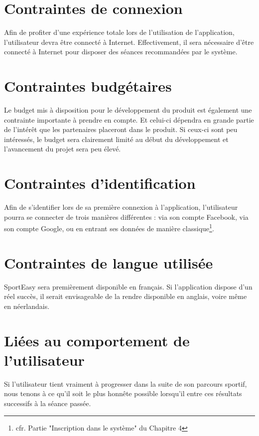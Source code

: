 \section{Contraintes de connexion}

Afin de profiter d'une expérience totale lors de l'utilisation de l'application, l'utilisateur devra être connecté à Internet. Effectivement, il sera nécessaire d'être connecté à Internet pour disposer des séances recommandées par le système.

\section{Contraintes budgétaires}

Le budget mis à disposition pour le développement du produit est également une contrainte importante à prendre en compte. Et celui-ci dépendra en grande partie de l'intérêt que les partenaires placeront dans le produit. Si ceux-ci sont peu intéressés, le budget sera clairement limité au début du développement et l'avancement du projet sera peu élevé.

\section{Contraintes d'identification}

Afin de s'identifier lors de sa première connexion à l'application, l'utilisateur pourra se connecter de trois manières différentes : via son compte Facebook, via son compte Google, ou en entrant ses données de manière classique\footnote{cfr. Partie "Inscription dans le système" du Chapitre 4}. 

\section{Contraintes de langue utilisée}

SportEasy sera premièrement disponible en français. Si l'application dispose d'un réel succès, il serait envisageable de la rendre disponible en anglais, voire même en néerlandais.

\section{Liées au comportement de l'utilisateur}

Si l'utilisateur tient vraiment à progresser dans la suite de son parcours sportif, nous tenons à ce qu'il soit le plus honnête possible lorsqu'il entre ces résultats successifs à la séance passée. 